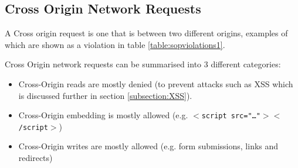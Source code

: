 \documentclass{mscreport}
\begin{document}
\begin{table}[h!]
  \begin{center}
    \caption{Same Origin triplet example violations}
    \label{table:sopviolations1} %
  \end{center}
\end{table}

\subsection{Cross Origin Network Requests}
A Cross origin request is one that is between two different origins, examples of which are shown as a violation in table \ref{table:sopviolations1}.

\vspace{0.3cm} \noindent
Cross Origin network requests can be summarised into 3 different categories:
\begin{itemize}
	\setlength\itemsep{0.1em}
	\item Cross-Origin reads are mostly denied (to prevent attacks such as XSS which is discussed further in section \ref{subsection:XSS}).
	\item Cross-Origin embedding is mostly allowed (e.g. \texttt{$<$script src="…"$><$/script$>$})
	\item Cross-Origin writes are mostly allowed (e.g. form submissions, links and redirects)
\end{itemize}
\end{document}
